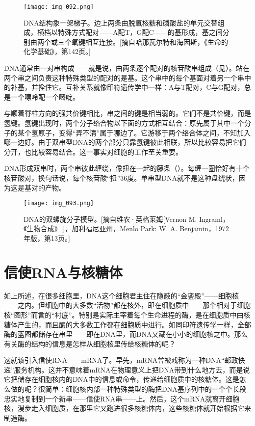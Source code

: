 \begin{figure}
\texttt{[image: img\_092.png]}
\caption[DNA的梯状结构。]
  {DNA结构象一架梯子。边上两条由脱氧核糖和磷酸盐的单元交替组成，横档以特殊方式配对——A配T，G配C——的基形成，基之间分别由两个或三个氧键相互连接。[摘自哈那瓦尔特和海因斯，《生命的化学基础》，第142页。] }
\end{figure}

DNA通常由一对串构成——就是说，由两条逐个配对的核苷酸串组成（见）。站在两个串之间负责这种特殊类型的配对的是基。这个串中的每个基面对着另一个串中的补基，并拴住它。互补关系就像印符遗传学中一样：A与T配对，C与G配对，总是一个嘌呤配一个嘧啶。

与顺着脊柱方向的强共价键相比，串之间的键是相当弱的。它们不是共价键，而是氢键。氢键出现时，两个分子络合物以下面的方式相互结合：原先属于其中一个分子的某个氢原子，变得“弄不清”属于哪边了。它游移于两个络合体之间，不知加入哪一边好。由于双串型DNA的两个部分只靠氢键彼此相联，所以比较容易把它们分开，也比较容易结合。这一事实对细胞的工作至关重要。

DNA形成双串时，两个串彼此缠绕，像扭在一起的藤条（）。每缠一圈恰好有十个核苷酸对，换句话说，每个核苷酸“扭”$36$度。单串型DNA就不是这种盘绕状，因为这是基对的产物。

\begin{figure}
\texttt{[image: img\_093.png]}
\caption[DNA的双螺旋分子模型。]
  {DNA的双螺旋分子模型。[摘自维农·英格莱姆[Vernon M. Ingraml，《生物合成》[]，加利福尼亚州，Menlo Park: W. A. Benjamin，1972年版，第13页。] }
\end{figure}

\section{信使RNA与核糖体}

如上所述，在很多细胞里，DNA这个细胞君主住在隐蔽的“金銮殿”——细胞核——之内。但细胞中的大多数“活物”都在核外，即在细胞质中——那个相对于细胞核“图形”而言的“衬底”。特别是实际主宰着每个生命进程的酶，是在细胞质中由核糖体产生的，而且酶的大多数工作都在细胞质中进行。如同印符遗传学一样，全部酶的蓝图都储存在串里——即在DNA里，而DNA又藏在小小的细胞核之中。那么有关酶的结构的信息是怎样从细胞核里传给核糖体的呢？

这就该引入信使RNA——mRNA了。早先，mRNA曾被戏称为一种DNA“邮政快递”服务机构。这并不意味着mRNA在物理意义上把DNA带到什么地方去，而是说它把储存在细胞核内的DNA中的信息或命令，传递给细胞质中的核糖体。这是怎么做的呢？很简单：细胞核内部一种特殊类型的酶把DNA基序列中的一个个长段忠实地复制到一个新串——信使RNA串——上。然后，这个mRNA就离开细胞核，漫步走入细胞质，在那里它又跑进很多核糖体内，这些核糖体就开始根据它来制造酶。

